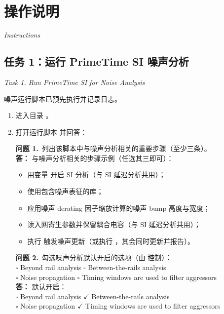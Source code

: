 \section{操作说明}
\label{lab9:instructions}

\noindent\textit{Instructions}

\subsection{任务 1：运行 PrimeTime SI 噪声分析}
\label{lab9:task1}

\noindent\textit{Task 1. Run PrimeTime SI for Noise Analysis}

噪声运行脚本已预先执行并记录日志。

\begin{enumerate}
  \item 进入目录 。

  \item 打开运行脚本  并回答：
\begin{questionBox}
\textbf{问题 1.}\ 列出该脚本中与噪声分析相关的重要步骤（至少三条）。\\[0.35em]
\textbf{答：} 与噪声分析相关的步骤示例（任选其三即可）：
\begin{itemize}
  \item 用变量  开启 SI 分析（与 SI 延迟分析共用）；
  \item 使用包含噪声表征的库；
  \item 应用噪声 derating 因子缩放计算的噪声 bump 高度与宽度；
  \item 读入网寄生参数并保留耦合电容（与 SI 延迟分析共用）；
  \item 执行  触发噪声更新（或执行 ，其会同时更新并报告）。
\end{itemize}
\end{questionBox}

\begin{questionBox}
\textbf{问题 2.}\ 勾选噪声分析默认开启的选项（由  控制）：\\
\quad$\square$ Beyond rail analysis \quad$\square$ Between-the-rails analysis\\
\quad$\square$ Noise propagation \quad$\square$ Timing windows are used to filter aggressors\\[0.35em]
\textbf{答：} 默认开启：\\
\quad$\square$ Beyond rail analysis \quad$\checkmark$ Between-the-rails analysis\\
\quad$\square$ Noise propagation \quad$\checkmark$ Timing windows are used to filter aggressors
\end{questionBox}


\end{enumerate}
